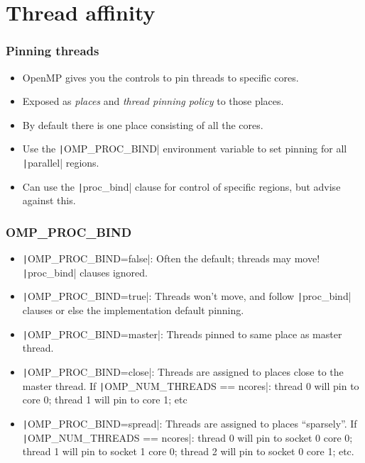 \documentclass{beamer}
\begin{document}
\section{Thread affinity}
\begin{frame}
\frametitle{Pinning threads}
\begin{itemize}
  \item OpenMP gives you the controls to pin threads to specific cores.
  \item Exposed as \emph{places} and \emph{thread pinning policy} to those places.
  \item By default there is one place consisting of all the cores.
  \item Use the \texttt|OMP_PROC_BIND| environment variable to set pinning for all \texttt|parallel| regions.
  \item Can use the \texttt|proc_bind| clause for control of specific regions, but advise against this.
\end{itemize}
\end{frame}

\begin{frame}
\frametitle{OMP\_PROC\_BIND}
\begin{itemize}
  \item \texttt|OMP_PROC_BIND=false|: Often the default; threads may move! \texttt|proc_bind| clauses ignored.
  \item \texttt|OMP_PROC_BIND=true|: Threads won't move, and follow \texttt|proc_bind| clauses or else the implementation default pinning.
  \item \texttt|OMP_PROC_BIND=master|: Threads pinned to same place as master thread.
  \item \texttt|OMP_PROC_BIND=close|: Threads are assigned to places close to the master thread.
  If \texttt|OMP_NUM_THREADS == ncores|: thread 0 will pin to core 0; thread 1 will pin to core 1; etc
  \item \texttt|OMP_PROC_BIND=spread|: Threads are assigned to places ``sparsely''.
  If \texttt|OMP_NUM_THREADS == ncores|: thread 0 will pin to socket 0 core 0; thread 1 will pin to socket 1 core 0; thread 2 will pin to socket 0 core 1; etc.
\end{itemize}
\end{frame}
\end{document}
